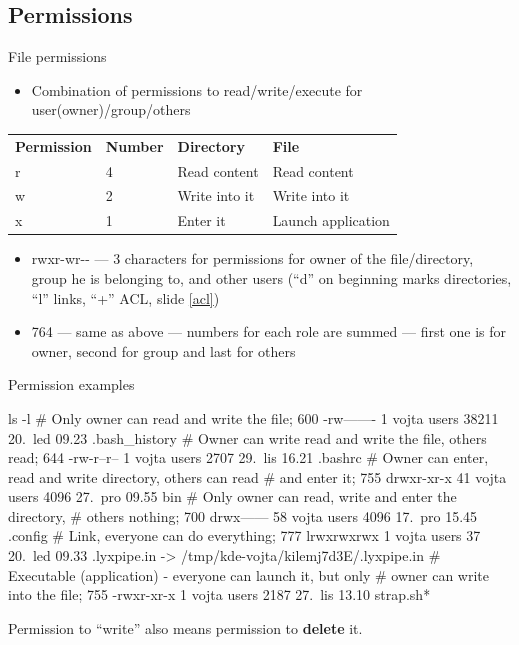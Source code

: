 \documentclass[compress, ucs, xelatex, 11pt, xcolor=svgnames,
  hyperref={
    bookmarks=true,
    unicode=true,
    colorlinks=true,
    pdftitle={Linux, command line and MetaCentrum},
    plainpages=false,
    pdfauthor={Vojtech Zeisek},
    pdfsubject={Course about use of Linux command line, writing shell scripts and using MetaCentrum of CESNET},
    pdfcreator={XeLaTeX, http://www.xelatex.org/},
    pdfkeywords={Linux, GNU, BASH, shell, command line, MetaCentrum},
    linkcolor=Sienna,
    anchorcolor=black,
    citecolor=green,
    filecolor=magenta,
    menucolor=Sienna,
    urlcolor=cyan,
    pdftex},
  url={hyphens, lowtilde} %
  ]{beamer}
\begin{document}
\subsection{Permissions}

\begin{frame}{File permissions}
\begin{itemize}
  \item Combination of permissions to read/write/execute for user(owner)/group/others
\end{itemize}
\begin{center}
\begin{tabular}{llll}
\textbf{Permission} & \textbf{Number} & \textbf{Directory} & \textbf{File}\\
r & 4 & Read content & Read content\\
w & 2 & Write into it & Write into it\\
x & 1 & Enter it & Launch application \\
\end{tabular}
\end{center}
\begin{itemize}
  \item rwxr-wr{-}- --- 3 characters for permissions for owner of the file/directory, group he is belonging to, and other users (``d'' on beginning marks directories, ``l'' links, ``+'' ACL, slide \ref{acl})
  \item 764 --- same as above --- numbers for each role are summed --- first one is for owner, second for group and last for others
\end{itemize}
\end{frame}

\begin{frame}[fragile]{Permission examples}
\begin{bashcode}
    ls -l
    # Only owner can read and write the file; 600
    -rw-------   1 vojta users   38211 20. led 09.23 .bash_history
    # Owner can write read and write the file, others read; 644
    -rw-r--r--   1 vojta users    2707 29. lis 16.21 .bashrc
    # Owner can enter, read and write directory, others can read
    # and enter it; 755
    drwxr-xr-x  41 vojta users    4096 27. pro 09.55 bin
    # Only owner can read, write and enter the directory,
    # others nothing; 700
    drwx------  58 vojta users    4096 17. pro 15.45 .config
    # Link, everyone can do everything; 777
    lrwxrwxrwx   1 vojta users      37 20. led 09.33 .lyxpipe.in ->
      /tmp/kde-vojta/kilemj7d3E/.lyxpipe.in
    # Executable (application) - everyone can launch it, but only
    # owner can write into the file; 755
    -rwxr-xr-x   1 vojta users    2187 27. lis 13.10 strap.sh*
\end{bashcode}
\vfil
Permission to ``write'' also means permission to \textbf{delete} it.
\end{frame}
\end{document}
